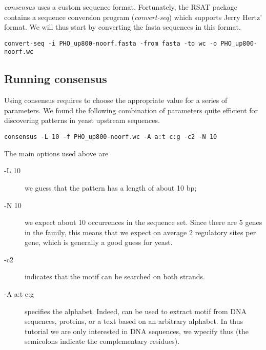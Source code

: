 \textit{consensus} uses a custom sequence format. Fortunately, the RSAT
package contains a sequence conversion program (\textit{convert-seq})
which supports Jerry Hertz' format. We will thus start by converting
the fasta sequences in this format. 

{\color{Blue} \begin{footnotesize} 
\begin{verbatim}
convert-seq -i PHO_up800-noorf.fasta -from fasta -to wc -o PHO_up800-noorf.wc
\end{verbatim} \end{footnotesize}
}


\subsection{Running consensus}

Using consensus requires to choose the appropriate value for a series
of parameters. We found the following combination of parameters quite
efficient for discovering patterns in yeast upstream sequences.

{\color{Blue} \begin{footnotesize} 
\begin{verbatim}
consensus -L 10 -f PHO_up800-noorf.wc -A a:t c:g -c2 -N 10
\end{verbatim} \end{footnotesize}
}

The main options used above are

\begin{description}
\item[-L 10] we guess that the pattern has a length of about 10 bp;

\item[-N 10] we expect about 10 occurrences in the sequence set. Since
  there are 5 genes in the family, this means that we expect on
  average 2 regulatory sites per gene, which is generally a good guess
  for yeast.

\item[-c2] indicates  that the motif can be searched
  on both strands.

\item[-A a:t c:g] specifies the alphabet. Indeed, 
  can be used to extract motif from DNA sequences, proteins, or a text
  based on an arbitrary alphabet. In thus tutorial we are only
  interested in DNA sequences, we wpecify thus 
  (the semicolons indicate the complementary residues).
\end{description}

